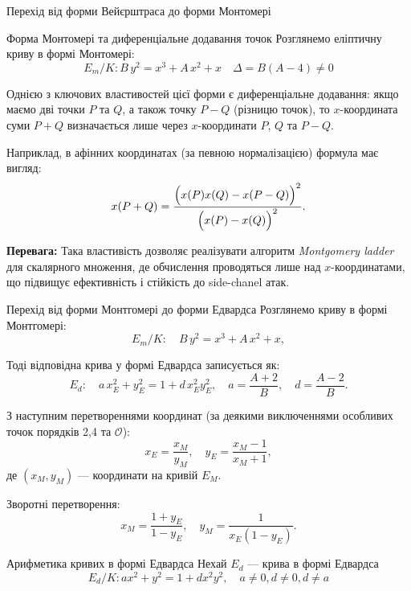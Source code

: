 \documentclass[9pt]{beamer}
\begin{document}
\begin{darkframes}
\begin{frame}{Перехід від форми Вейєрштраса до форми Монтомері}
\end{frame}

\begin{frame}{Форма Монтомері та диференціальне додавання точок}
  Розглянемо еліптичну криву в формі Монтомері:
  \[
  E_m/K: B\,y^2 = x^3 + A\,x^2 + x \quad \Delta= B(A-4)\neq 0
  \]

  Однією з ключових властивостей цієї форми є диференціальне додавання: якщо маємо дві точки \(P\) та \(Q\), а також точку \(P-Q\) (різницю точок), то \(x\)-координата суми \(P+Q\) визначається лише через \(x\)-координати \(P\), \(Q\) та \(P-Q\).
  
  Наприклад, в афінних координатах (за певною нормалізацією) формула має вигляд:
  \[
  x(P+Q) = \frac{\Bigl(x(P)x(Q) - x(P-Q)\Bigr)^2}{\Bigl(x(P)-x(Q)\Bigr)^2}.
  \]
  

  \textbf{Перевага:}  
  Така властивість дозволяє реалізувати алгоритм \emph{Montgomery ladder} для скалярного множення, де обчислення проводяться лише над \(x\)-координатами, що підвищує ефективність і стійкість до side-chanel атак.
\end{frame}


\begin{frame}{Перехід від форми Монтгомері до форми Едвардса}
  Розглянемо криву в формі Монтгомері:
  \[
  E_m/K: \quad B\,y^2 = x^3 + A\,x^2 + x,
  \]

  Тоді відповідна крива у формі Едвардса записується як:
  \[
  E_d: \quad a\,x_E^2 + y_E^2 = 1 + d\,x_E^2y_E^2, \quad
  a = \frac{A+2}{B},\quad d = \frac{A-2}{B}.
  \]

  З наступним перетвореннями координат (за деякими виключеннями особливих точок порядків 2,4 та $\mathcal{O}$):
  \[
  x_E = \frac{x_M}{y_M},\quad
  y_E = \frac{x_M-1}{x_M+1},
  \]
  де \((x_M,y_M)\) --- координати на кривій \(E_M\).

  Зворотні перетворення:
  \[
  x_M = \frac{1+y_E}{1-y_E},\quad
  y_M =\frac{1}{x_E(1-y_E)}.
  \]
  
\end{frame}



\begin{frame}{Арифметика кривих в формі Едвардса}
  Нехай \(E_d\) --- крива в формі Едвардса
  \[
  E_d/K:a x^2 + y^2 = 1 + d x^2 y^2, \quad a \neq 0, d\neq0, d\neq a
  \]


\end{frame}
\end{darkframes}
\end{document}

